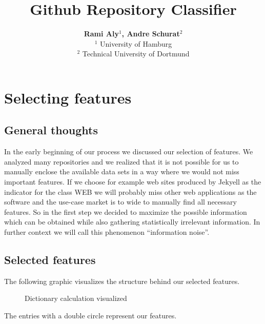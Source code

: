 \documentclass[paper=A4,pagesize=auto,12pt,headinclude=true,footinclude=true,BCOR=0mm,DIV=calc]{scrartcl}
\begin{document}
	
	\title{Github Repository Classifier}
	\author{\textbf{Rami Aly$^{1}$, Andre Schurat}$^{2}$\\
		$^{1}$ University of Hamburg\\
		$^{2}$ Technical University of Dortmund}
	\maketitle
	
	\newpage
	
	\newpage
	
	\tableofcontents 
	
	\newpage
	\section{Selecting features} 
	\subsection{General thoughts}
	In the early beginning of our process we discussed our selection of features. We analyzed many repositories and we realized that it is not possible for us to manually enclose the available data sets in a way where we would not miss important features. If we choose for example web sites produced by Jekyell as the indicator for the class WEB we will probably miss other web applications as the software and the use-case market is to wide to manually find all necessary features. So in the first step we decided to maximize the possible information which can be obtained while also gathering statistically irrelevant information. In further context we will call this phenomenon “information noise”.
	\subsection{Selected features}
	The following graphic visualizes the structure behind our selected features.
	
	\begin{figure}[H]
		\caption{Dictionary calculation visualized}
	\end{figure}
	The entries with a double circle represent our features.
	
\end{document}
